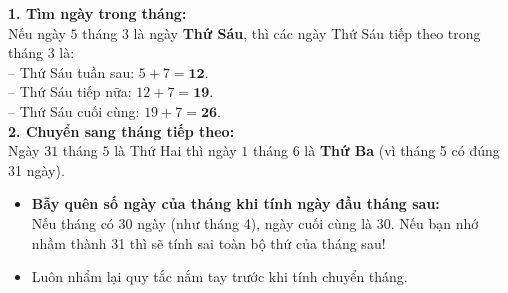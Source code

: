 \documentclass[11pt,a4paper]{article}
\begin{document}
\vspace{-2.5mm}
\noindent
\begin{minipage}[t]{0.49\textwidth}\vspace{0pt}
\begin{tcolorbox}[
  enhanced,
  colback=green!4!white,
  colframe=green!60!black,
  arc=2mm, boxrule=0.8pt,
  left=2mm, right=2mm, top=1.8mm, bottom=1.8mm,
  title={\footnotesize\bfseries\color{white}\faCheckCircle\ Ví dụ thực hành chuẩn mực}
]
{\footnotesize
\textbf{1. Tìm ngày trong tháng:}\\
Nếu ngày $5$ tháng $3$ là ngày \textbf{Thứ Sáu}, thì các ngày Thứ Sáu tiếp theo trong tháng $3$ là:\\
-- Thứ Sáu tuần sau: $5 + 7 = \mathbf{12}$.\\
-- Thứ Sáu tiếp nữa: $12 + 7 = \mathbf{19}$.\\
-- Thứ Sáu cuối cùng: $19 + 7 = \mathbf{26}$.\\
\textbf{2. Chuyển sang tháng tiếp theo:}\\
Ngày $31$ tháng $5$ là Thứ Hai thì ngày $1$ tháng $6$ là \textbf{Thứ Ba} (vì tháng 5 có đúng 31 ngày).
}
\end{tcolorbox}
\end{minipage}
\hfill
\begin{minipage}[t]{0.49\textwidth}\vspace{0pt}
\begin{tcolorbox}[
  enhanced,
  colback=red!4!white,
  colframe=red!70!black,
  arc=2mm, boxrule=0.8pt,
  left=2mm, right=2mm, top=1.8mm, bottom=1.8mm,
  title={\footnotesize\bfseries\color{white}\faExclamationTriangle\ Mẹo tránh bẫy trắc nghiệm}
]
{\footnotesize
\begin{itemize}\setlength{\itemsep}{1.5pt}\setlength{\leftskip}{-2.5mm}
  \item \textbf{Bẫy quên số ngày của tháng khi tính ngày đầu tháng sau:}\\
  Nếu tháng có $30$ ngày (như tháng 4), ngày cuối cùng là 30. Nếu bạn nhớ nhầm thành 31 thì sẽ tính sai toàn bộ thứ của tháng sau!
  \item Luôn nhẩm lại quy tắc nắm tay trước khi tính chuyển tháng.
\end{itemize}
}
\end{tcolorbox}
\end{minipage}
\end{document}
